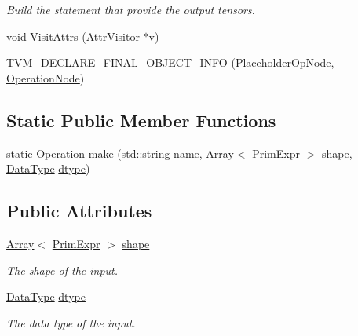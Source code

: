 \begin{DoxyCompactItemize}
\begin{DoxyCompactList}\small\item\em Build the statement that provide the output tensors. \end{DoxyCompactList}\item 
void \hyperlink{classtvm_1_1te_1_1PlaceholderOpNode_a5bf09a2782cf05e19d0912ec3fbba9e9}{Visit\+Attrs} (\hyperlink{classtvm_1_1AttrVisitor}{Attr\+Visitor} $\ast$v)
\item 
\hyperlink{classtvm_1_1te_1_1PlaceholderOpNode_af6c7ed8827416057732e6b9e8eef513e}{T\+V\+M\+\_\+\+D\+E\+C\+L\+A\+R\+E\+\_\+\+F\+I\+N\+A\+L\+\_\+\+O\+B\+J\+E\+C\+T\+\_\+\+I\+N\+FO} (\hyperlink{classtvm_1_1te_1_1PlaceholderOpNode}{Placeholder\+Op\+Node}, \hyperlink{classtvm_1_1te_1_1OperationNode}{Operation\+Node})
\end{DoxyCompactItemize}
\subsection*{Static Public Member Functions}
\begin{DoxyCompactItemize}
\item 
static \hyperlink{classtvm_1_1te_1_1Operation}{Operation} \hyperlink{classtvm_1_1te_1_1PlaceholderOpNode_a8141a03c4cf35d02860ed44b6773a7ca}{make} (std\+::string \hyperlink{classtvm_1_1te_1_1OperationNode_ad2fd6f140257f7b3c311f88374fa74d2}{name}, \hyperlink{classtvm_1_1Array}{Array}$<$ \hyperlink{classtvm_1_1PrimExpr}{Prim\+Expr} $>$ \hyperlink{classtvm_1_1te_1_1PlaceholderOpNode_a301fb989a618e248d69120f6c7b33c3f}{shape}, \hyperlink{namespacetvm_a41918af1a1dc386388639a9d3ad06c5d}{Data\+Type} \hyperlink{classtvm_1_1te_1_1PlaceholderOpNode_a4c0ad4ece5214f3638a101c3f4aef38b}{dtype})
\end{DoxyCompactItemize}
\subsection*{Public Attributes}
\begin{DoxyCompactItemize}
\item 
\hyperlink{classtvm_1_1Array}{Array}$<$ \hyperlink{classtvm_1_1PrimExpr}{Prim\+Expr} $>$ \hyperlink{classtvm_1_1te_1_1PlaceholderOpNode_a301fb989a618e248d69120f6c7b33c3f}{shape}
\begin{DoxyCompactList}\small\item\em The shape of the input. \end{DoxyCompactList}\item 
\hyperlink{namespacetvm_a41918af1a1dc386388639a9d3ad06c5d}{Data\+Type} \hyperlink{classtvm_1_1te_1_1PlaceholderOpNode_a4c0ad4ece5214f3638a101c3f4aef38b}{dtype}
\begin{DoxyCompactList}\small\item\em The data type of the input. \end{DoxyCompactList}\end{DoxyCompactItemize}

